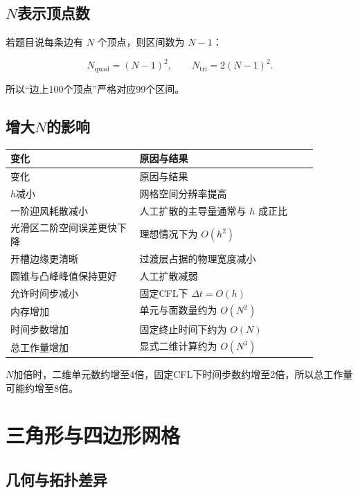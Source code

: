 \documentclass[UTF8,12pt,a4paper,fontset=fandol]{ctexart}
\numberwithin{equation}{section}
\begin{document}
\subsection{\texorpdfstring{$N$}{N}表示顶点数}

若题目说每条边有 $N$ 个顶点，则区间数为 $N-1$：

\begin{equation}
  N_{\mathrm{quad}}=(N-1)^2,
  \qquad
  N_{\mathrm{tri}}=2(N-1)^2.
\end{equation}

所以“边上100个顶点”严格对应99个区间。

\subsection{增大\texorpdfstring{$N$}{N}的影响}

\begin{longtable}{L{0.37\linewidth}L{0.51\linewidth}}
\toprule
变化 & 原因与结果\\
\midrule
\endfirsthead
\toprule
变化 & 原因与结果\\
\midrule
\endhead
$h$减小 & 网格空间分辨率提高\\
一阶迎风耗散减小 & 人工扩散的主导量通常与 $h$ 成正比\\
光滑区二阶空间误差更快下降 & 理想情况下为 $O(h^2)$\\
开槽边缘更清晰 & 过渡层占据的物理宽度减小\\
圆锥与凸峰峰值保持更好 & 人工扩散减弱\\
允许时间步减小 & 固定CFL下 $\Delta t=O(h)$\\
内存增加 & 单元与面数量约为 $O(N^2)$\\
时间步数增加 & 固定终止时间下约为 $O(N)$\\
总工作量增加 & 显式二维计算约为 $O(N^3)$\\
\bottomrule
\end{longtable}

$N$加倍时，二维单元数约增至4倍，固定CFL下时间步数约增至2倍，所以总工作量可能约增至8倍。

\section{三角形与四边形网格}

\subsection{几何与拓扑差异}
\end{document}
